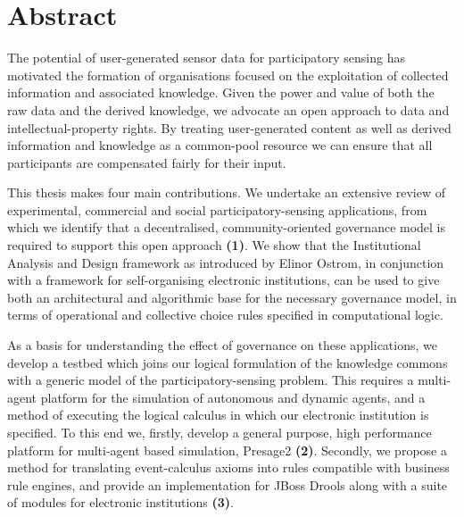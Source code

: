 \begingroup
\let\clearpage\relax
\let\cleardoublepage\relax
\let\cleardoublepage\relax

\chapter*{Abstract}

The potential of user-generated sensor data for participatory sensing has motivated the formation of organisations focused on the exploitation of collected information and associated knowledge. 
Given the power and value of both the raw data and the derived knowledge, we advocate an open approach to data and intellectual-property rights. By treating user-generated content as well as derived information and knowledge 
as a common-pool resource we can ensure that
all participants are compensated fairly for their input.

This thesis makes four main contributions. We undertake an extensive review of experimental, commercial and social participatory-sensing applications, from which we identify that a decentralised, community-oriented governance model is required
to support this open approach \textbf{(1)}. We show that the Institutional Analysis and Design framework as introduced by Elinor Ostrom, in conjunction
with a framework for self-organising electronic institutions, can be used to give both an architectural
and algorithmic base for the necessary governance model, in terms of operational and collective choice rules
specified in computational logic.

As a basis for understanding the effect of governance on these applications, we develop a testbed which joins our logical formulation of the knowledge commons with a generic model of the participatory-sensing problem.
This requires a multi-agent platform for the simulation of autonomous and dynamic agents, and a method of executing the logical calculus in which our electronic institution is specified. 
To this end we, firstly, develop a general purpose, high performance platform for multi-agent based simulation, Presage2 \textbf{(2)}. 
Secondly, we propose a method for translating event-calculus axioms into rules compatible with business rule engines, and provide an implementation for JBoss Drools along with a suite of modules for electronic institutions \textbf{(3)}.

